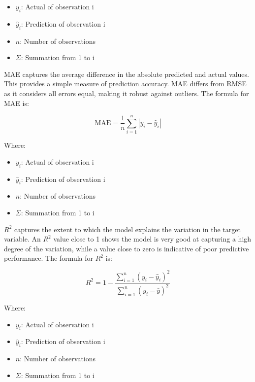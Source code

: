 \documentclass{article}
\begin{document}
\begin{itemize}
    \item $y_i$: Actual of observation i
    \item $\hat{y}_i$: Prediction of observation i
    \item $n$: Number of observations
    \item $\Sigma$: Summation from 1 to i
\end{itemize}

MAE captures the average difference in the absolute predicted and actual values. This provides
a simple measure of prediction accuracy. MAE differs from RMSE as it considers all errors
equal, making it robust against outliers. The formula for MAE is:

\begin{equation*}
\text{MAE} = \frac{1}{n}\sum_{i=1}^{n}|y_i - \hat{y}_i|
\end{equation*}

Where:

\begin{itemize}
    \item $y_i$: Actual of observation i
    \item $\hat{y}_i$: Prediction of observation i
    \item $n$: Number of observations
    \item $\Sigma$: Summation from 1 to i
\end{itemize}

$R^2$ captures the extent to which the model explains the variation in the target variable. An $R^2$
value close to 1 shows the model is very good at capturing a high degree of the variation, while
a value close to zero is indicative of poor predictive performance. The formula for $R^2$ is:

\begin{equation*}
R^2 = 1 - \frac{\sum_{i=1}^{n}(y_i - \hat{y}_i)^2}{\sum_{i=1}^{n}(y_i - \bar{y})^2}
\end{equation*}

Where:

\begin{itemize}
    \item $y_i$: Actual of observation i
    \item $\hat{y}_i$: Prediction of observation i
    \item $n$: Number of observations
    \item $\Sigma$: Summation from 1 to i
\end{itemize}
\end{document}

